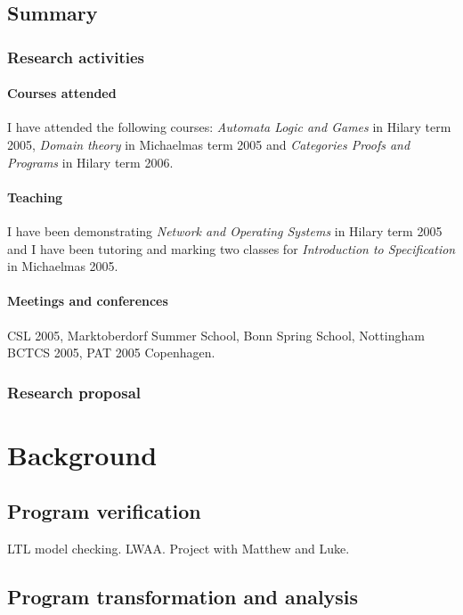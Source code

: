 \documentclass[nocenter]{thesis}
\begin{document}
\tableofcontents


\chapter{Summary}

\section{Research activities}

\subsection{Courses attended}

I have attended the following courses: \emph{Automata Logic and
Games} in Hilary term 2005, \emph{Domain theory} in Michaelmas term
2005 and \emph{Categories Proofs and Programs} in Hilary term 2006.

\subsection{Teaching}

I have been demonstrating \emph{Network and Operating Systems} in
Hilary term 2005 and I have been tutoring and marking two classes
for \emph{Introduction to Specification} in Michaelmas 2005.

\subsection{Meetings and conferences}


CSL 2005, Marktoberdorf Summer School, Bonn Spring School,
Nottingham BCTCS 2005, PAT 2005 Copenhagen.


\section{Research proposal}

\part{Background}
\chapter{Program verification}
LTL model checking. LWAA. Project with Matthew and Luke.

\chapter{Program transformation and analysis}
\end{document}
